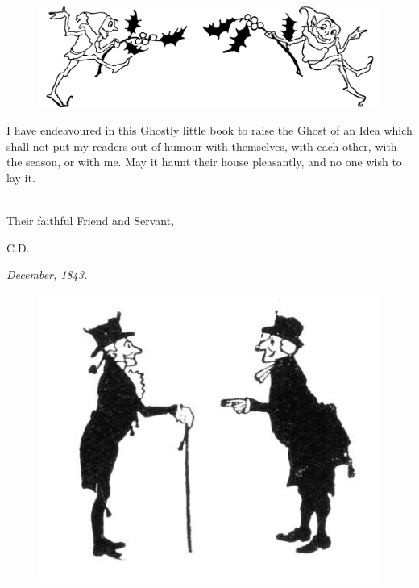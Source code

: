 \documentclass[
a5paper,
BCOR=7mm,
twoside,
DIV=calc,
fontsize=12pt,
usegeometry,
dottedtocline,
headers=normal,
listof=numbered,
listof=totoc,
listof=flat,
listof=nochaptergap]{scrbook} %
\begin{document}
\clearpage

\renewcommand{\listfigurename}{List of Illustrations}
\listoffigures
\vfill
\begin{figure}[h]
\centering
\includegraphics[width=.9\textwidth]{doublelf}
\caption[Tailpiece to List of Illustrations]{}
\end{figure}
\clearpage


\pagestyle{headings}
\newcommand{\moderatelyhuge}{\fontsize{40}{50}\selectfont}

\lettrine[lines=4]{I}{} have endeavoured in this Ghostly little book to raise the Ghost of an Idea which shall not put my readers out of humour with themselves, with each other, with the season, or with me. May it haunt their house pleasantly, and no one wish to lay it.

~\\

Their faithful Friend and Servant,

\begin{flushright}
\textsc{C.D.}
\end{flushright}

\textit{December, 1843.}
\vfill
\begin{figure}[h]
\centering
\includegraphics[width=.5\textwidth]{gs007}
\caption[Tailpiece to Preface]{}
\end{figure}
\end{document}
